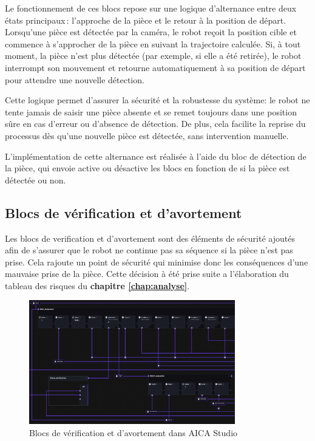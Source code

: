 Le fonctionnement de ces blocs repose sur une logique d'alternance entre deux états principaux : l'approche de la pièce et le retour à la position de départ. Lorsqu'une pièce est détectée par la caméra, le robot reçoit la position cible et commence à s'approcher de la pièce en suivant la trajectoire calculée. Si, à tout moment, la pièce n'est plus détectée (par exemple, si elle a été retirée), le robot interrompt son mouvement et retourne automatiquement à sa position de départ pour attendre une nouvelle détection.

Cette logique permet d'assurer la sécurité et la robustesse du système: le robot ne tente jamais de saisir une pièce absente et se remet toujours dans une position sûre en cas d'erreur ou d'absence de détection. De plus, cela facilite la reprise du processus dès qu'une nouvelle pièce est détectée, sans intervention manuelle.

L'implémentation de cette alternance est réalisée à l'aide du bloc de détection de la pièce, qui envoie active ou désactive les blocs en fonction de si la pièce est détectée ou non.


\subsection{Blocs de vérification et d'avortement}

Les blocs de verification et d'avortement sont des éléments de sécurité ajoutés afin de s'assurer que le robot ne continue pas sa séquence si la pièce n'est pas prise. Cela rajoute un point de sécurité qui minimise donc les conséquences d'une mauvaise prise de la pièce.  Cette décision à été prise suite a l'élaboration du tableau des risques du \textbf{chapitre \ref{chap:analyse}}.

\begin{figure}[H]
    \centering
    \includegraphics[width=0.8\textwidth]{assets/figures/AICA_Abort_sequence.png}
    \caption{Blocs de vérification et d'avortement dans AICA Studio}
    \label{fig:verification_block}
\end{figure}


